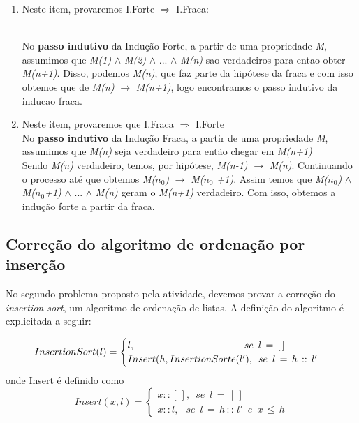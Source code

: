 \documentclass[a4paper, 10pt]{article}
\begin{document}
\begin{enumerate}
\item Neste item, provaremos I.Forte $\Rightarrow$ I.Fraca:

	\\No \textbf{passo indutivo} da Indução Forte, a partir de uma propriedade \textit{M}, assumimos que \textit{M(1)} $\wedge$ \textit{M(2)} $\wedge$ ... $\wedge$ \textit{M(n)} sao verdadeiros para entao obter \textit{M(n+1)}. 
    Disso, podemos  \textit{M(n)}, que faz parte da hipótese da fraca e com isso obtemos que de \textit{M(n)} $\rightarrow$ \textit{M(n+1)}, logo encontramos o passo indutivo da inducao fraca.

\item Neste item, provaremos que I.Fraca $\Rightarrow$ I.Forte 
	\\	No \textbf{passo indutivo} da Indução Fraca, a partir de uma propriedade \textit{M}, assumimos que \textit{M(n)} seja verdadeiro para então chegar em \textit{M(n+1)}
    \\	Sendo \textit{M(n)} verdadeiro, temos, por hipótese, \textit{M(n-1)} $\rightarrow$ \textit{M(n)}. Continuando o processo até que obtemos \textit{M($n_0$)} $\rightarrow$ \textit{M($n_0$ +1)}. Assim temos que \textit{M($n_0$)} $\wedge$ \textit{M($n_0$+1)} $\wedge$ ... $\wedge$ \textit{M(n)} geram o \textit{M(n+1)} verdadeiro.
    Com isso, obtemos a indução forte a partir da fraca.
\end{enumerate}


\subsection{Correção do algoritmo de ordenação por inserção}

No segundo problema proposto pela atividade, devemos provar a correção do \textit{insertion sort}, um algoritmo de ordenação de listas. A definição do algoritmo é explicitada a seguir:

  \begin{equation}
  \label{eq:sort}
      InsertionSort(l) =
      \begin{cases}
          l, \hspace{11.2em}			 	      se \enspace l\,=\,[\,]\\
          Insert(h, InsertionSorte(l'),\enspace se \enspace l\,=\,h\,::\,l'
      \end{cases}
  \end{equation}
  onde Insert é definido como
  \begin{equation}
  \label{eq:insert}
      Insert(x,l) =
      \begin{cases}
          x::[\,],\enspace se\enspace l\,=\,[\,] \\
          x::l,\: \enspace se\enspace l\,=\,h\,::\,l'\enspace e \enspace x\, \leq \, h
      \end{cases}
  \end{equation}
\end{document}
